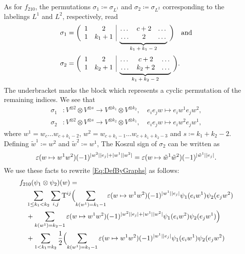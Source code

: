 \documentclass[\MainFolder/Text.tex]{subfiles}
\begin{document}
\begin{Example}
As for $f_{210}$, the permutations $\sigma_1\coloneqq\sigma_{L^1}$ and $\sigma_2\coloneqq \sigma_{L^2}$ corresponding to the labelings $L^1$ and $L^2$, respectively, read
$$\begin{aligned}
\sigma_{1} &= \biggl(\begin{array}{cc|ccc}
 1 & 2     & \dots & c+2 & \dots \\
 1 & k_1+1 & \undermat{k_1+k_1-2}{\dots& c+2 & \dots}\dots & 2& \dots 
\end{array}\biggr)\quad\text{and}\\[4ex]
\sigma_{2} &= \biggl(\begin{array}{cc|ccc}
 1 & 2     & \dots & c+2 & \dots  \\
 1 & k_2+1 & \undermat{k_1+k_2-2}{\dots & k_2 + 2 & \dots}\dots & k_2 + 2 & \dots
\end{array}\biggr).\\[3ex]
\end{aligned}$$
The underbracket marks the block which represents a cyclic permutation of the remaining indices. We see that 
$$\begin{aligned}
\sigma_{1}&:  V^{\otimes 2} \otimes V^{\otimes s} \longrightarrow V^{\otimes k_1}\otimes V^{\otimes k_2},\quad e_i e_j w \longmapsto e_i w^1 e_j w^2,  \\
\sigma_{2}&: V^{\otimes 2}\otimes V^{\otimes s} \longrightarrow V^{\otimes k_2}\otimes V^{\otimes k_1},\quad e_i e_j w  \longmapsto e_i w^2 e_j w^1,
\end{aligned}$$
where $w^1 = w_c \dots w_{c+k_1-2}$, $w^2 = w_{c+k_1-1}\dots w_{c+k_1+k_2-3}$ and $s \coloneqq k_1 + k_2 - 2$. Defining $\tilde{w}^1 \coloneqq w^2$ and $\tilde{w}^2 \coloneqq w^1$, The Koszul sign of $\sigma_2$ can be written as
$$ \varepsilon(w\mapsto w^1 w^2) (-1)^{\Abs{w^2}\Abs{e_j} + \Abs{w^1}\Abs{w^2}} = \varepsilon(w\mapsto \tilde{w}^1 \tilde{w}^2 ) (-1)^{\Abs{\tilde{w}^1} \Abs{e_j}}. $$
We use these facts to rewrite \eqref{Eq:DefByGraphs} as follows:
$$\begin{aligned}
& f_{210}(\psi_1 \otimes \psi_2)(w) = \\ &\quad \sum_{\substack{1\le k_1 < k_2}} \sum_{i,j} \TKer^{ij} \Bigl(\sum_{k(w^1) = k_1 - 1} \varepsilon(w\mapsto w^1 w^2)(-1)^{\Abs{w^1}\Abs{e_j}} \psi_1(e_i w^1) \psi_2(e_j w^2) \\ &\quad {}+ \sum_{k(w^1) = k_2 - 1} \varepsilon(w\mapsto w^1 w^2) (-1)^{\Abs{w^2}\Abs{e_j} + \Abs{w^1}\Abs{w^2}} \psi_1(e_i w^2) \psi_2(e_j w^1)\Bigr) \\ 
&\quad + \sum_{1< k_1 = k_2} \frac{1}{2} \Bigl(\sum_{k(w^1) = k_1 - 1} \varepsilon(w\mapsto w^1 w^2)(-1)^{\Abs{w^1}\Abs{e_j}} \psi_1(e_i w^1) \psi_2(e_j w^2) \\ 

\end{aligned}$$
\end{Example}
\end{document}
